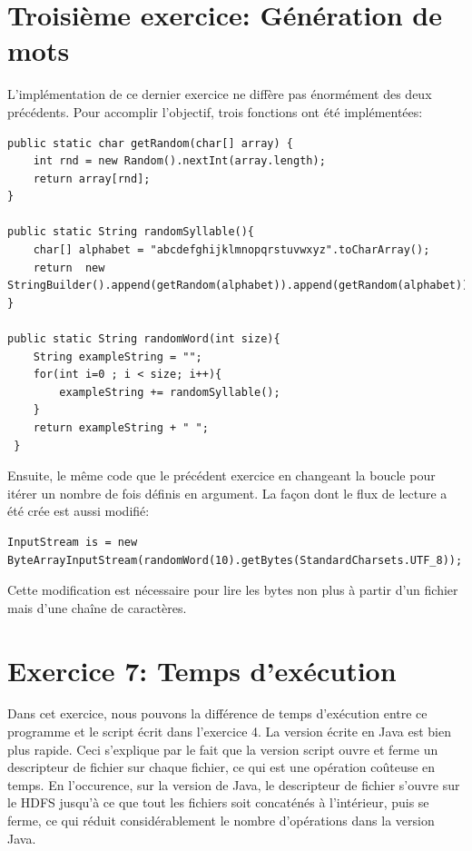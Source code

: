 \documentclass[a4paper]{article}
\begin{document}
\section{Troisième exercice: Génération de mots}
\label{sec:orgheadline12}
L'implémentation de ce dernier exercice ne diffère pas énormément des deux précédents.
Pour accomplir l'objectif, trois fonctions ont été implémentées:

\begin{lstlisting}
public static char getRandom(char[] array) {
    int rnd = new Random().nextInt(array.length);
    return array[rnd];
}

public static String randomSyllable(){
    char[] alphabet = "abcdefghijklmnopqrstuvwxyz".toCharArray();
    return  new StringBuilder().append(getRandom(alphabet)).append(getRandom(alphabet)).toString();
}

public static String randomWord(int size){
    String exampleString = "";
    for(int i=0 ; i < size; i++){
        exampleString += randomSyllable();
    }
    return exampleString + " ";
 }
\end{lstlisting}

Ensuite, le même code que le précédent exercice en changeant la boucle pour itérer un nombre de fois définis en argument.
La façon dont le flux de lecture a été crée est aussi modifié:
\begin{lstlisting}
InputStream is = new ByteArrayInputStream(randomWord(10).getBytes(StandardCharsets.UTF_8));
\end{lstlisting}

Cette modification est nécessaire pour lire les bytes non plus à partir d'un fichier mais d'une chaîne de caractères.


\section{Exercice 7: Temps d’exécution}
\label{sec:orgheadline13}
Dans cet exercice, nous pouvons la différence de temps d'exécution entre ce programme et le script écrit dans l'exercice 4. 
La version écrite en Java est bien plus rapide. 
Ceci s'explique par le fait que la version script ouvre et ferme un descripteur de fichier sur chaque fichier, ce qui est une opération coûteuse en temps. En l'occurence, sur la version de Java, le descripteur de fichier s'ouvre sur le HDFS jusqu'à ce que tout les fichiers soit concaténés à l'intérieur, puis se ferme, ce qui réduit considérablement le nombre d'opérations dans la version Java.
\end{document}
